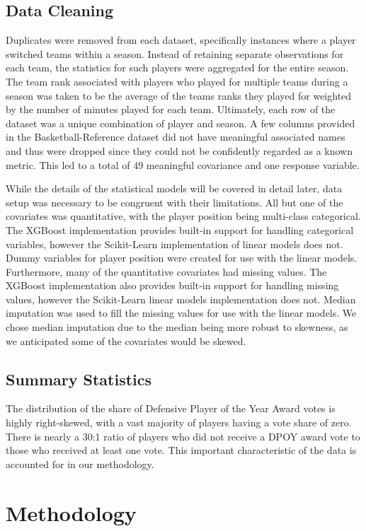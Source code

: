 \documentclass[letterpaper,titlepage]{article}
\begin{document}
    \subsection{Data Cleaning}
    Duplicates were removed from each dataset, specifically instances where a player switched teams within a season. Instead of retaining separate observations for each team, the statistics for such players were aggregated for the entire season. The team rank associated with players who played for multiple teams during a season was taken to be the average of the teams ranks they played for weighted by the number of minutes played for each team. Ultimately, each row of the dataset was a unique combination of player and season. A few columns provided in the Basketball-Reference dataset did not have meaningful associated names and thus were dropped since they could not be confidently regarded as a known metric. This led to a total of 49 meaningful covariance and one response variable.
    
    While the details of the statistical models will be covered in detail later, data setup was necessary to be congruent with their limitations. All but one of the covariates was quantitative, with the player position being multi-class categorical. The XGBoost implementation provides built-in support for handling categorical variables, however the Scikit-Learn implementation of linear models does not. Dummy variables for player position were created for use with the linear models. Furthermore, many of the quantitative covariates had missing values. The XGBoost implementation also provides built-in support for handling missing values, however the Scikit-Learn linear models implementation does not. Median imputation was used to fill the missing values for use with the linear models. We chose median imputation due to the median being more robust to skewness, as we anticipated some of the covariates would be skewed.

    \subsection{Summary Statistics}
    The distribution of the share of Defensive Player of the Year Award votes is highly right-skewed, with a vast majority of players having a vote share of zero. There is nearly a 30:1 ratio of players who did not receive a DPOY award vote to those who received at least one vote. This important characteristic of the data is accounted for in our methodology.


    \section{Methodology}
    
\end{document}
